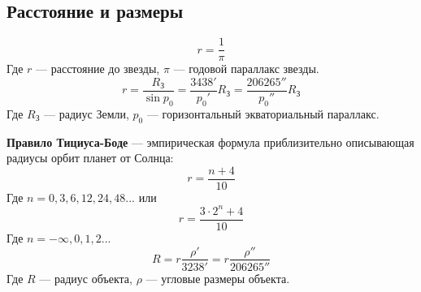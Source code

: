 \subsection{Расстояние и размеры}
\begin{equation}r=\frac{1}{\pi}
\end{equation}
Где $r$ --- расстояние до звезды, $\pi$ --- годовой параллакс звезды.
\begin{equation}r=\frac{R_{\text{З}}}{\sin p_0}=\frac{3438'}{p_0'}R_{\text{З}}=\frac{206265''}{p_0''}R_{\text{З}}
\end{equation}
Где $R_{\text{З}}$ --- радиус Земли, $p_0$ --- горизонтальный экваториальный параллакс.

\textbf{Правило Тициуса-Боде} --- эмпирическая формула приблизительно описывающая радиусы орбит планет от Солнца:
\begin{equation}r=\frac{n+4}{10}
\end{equation}
Где $n=0, 3 ,6, 12, 24, 48...$ или
\begin{equation}r=\frac{3\cdot 2^n+4}{10}
\end{equation}
Где $n=-\infty, 0, 1, 2...$
\begin{equation}R=r\frac{\rho'}{3238'}=r\frac{\rho''}{206265''}
\end{equation}
Где $R$ --- радиус объекта, $\rho$ --- угловые размеры объекта.
